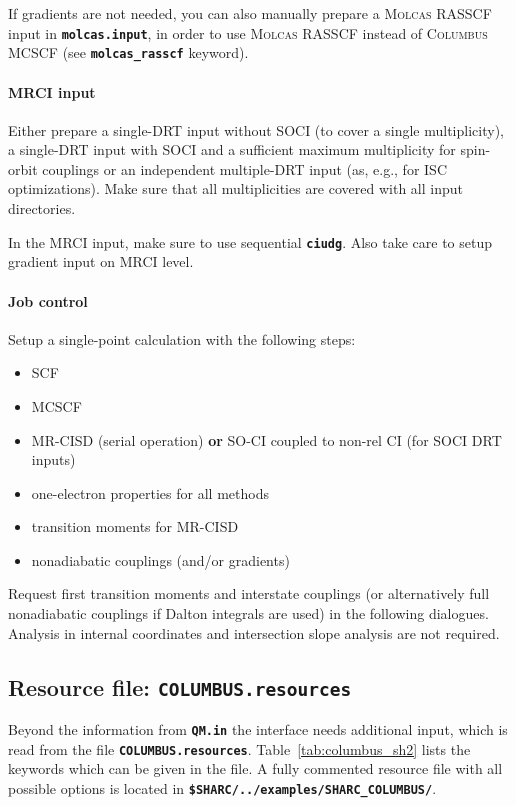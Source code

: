 \documentclass[a4paper,10pt,DIV=15,openany]{scrbook}
\newcommand{\ttt}[1]{\textbf{\texttt{#1}}}
\begin{document}
If gradients are not needed, you can also manually prepare a \textsc{Molcas} RASSCF input in \ttt{molcas.input}, in order to use \textsc{Molcas} RASSCF instead of \textsc{Columbus} MCSCF (see \ttt{molcas\_rasscf} keyword).

\paragraph{MRCI input}

Either prepare a single-DRT input without SOCI (to cover a single multiplicity), a single-DRT input with SOCI and a sufficient maximum multiplicity for spin-orbit couplings or an independent multiple-DRT input (as, e.g., for ISC optimizations). Make sure that all multiplicities are covered with all input directories.

In the MRCI input, make sure to use sequential \ttt{ciudg}. Also take care to setup gradient input on MRCI level.

\paragraph{Job control}

Setup a single-point calculation with the following steps:
\begin{itemize}
  \item SCF
  \item MCSCF
  \item MR-CISD (serial operation) \textbf{or} SO-CI coupled to non-rel CI (for SOCI DRT inputs)
  \item one-electron properties for all methods
  \item transition moments for MR-CISD
  \item nonadiabatic couplings (and/or gradients)
\end{itemize}

Request first transition moments and interstate couplings (or alternatively full nonadiabatic couplings if Dalton integrals are used) in the following dialogues. Analysis in internal coordinates and intersection slope analysis are not required.

\subsection{Resource file: \ttt{COLUMBUS.resources}}

Beyond the information from \ttt{QM.in} the interface needs additional input, which is read from the file \ttt{COLUMBUS.resources}. Table~\ref{tab:columbus_sh2} lists the keywords which can be given in the file.
A fully commented resource file with all possible options is located in \ttt{\$SHARC/../examples/SHARC\_COLUMBUS/}.
\end{document}
